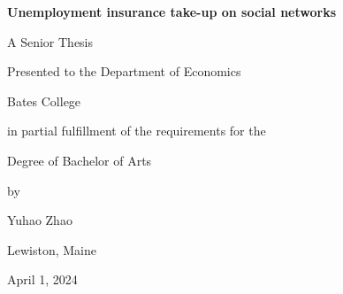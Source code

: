 

\vspace*{4cm} 

\centerline{\LARGE \textbf{Unemployment insurance take-up on social networks}}
\bigskip\bigskip
\centerline{\Large  A Senior Thesis}
\medskip
\centerline{\Large Presented to the Department of Economics}
\medskip
\centerline{\Large Bates College}
\medskip
\centerline{\Large in partial fulfillment of the requirements for the}
\medskip
\centerline{\Large Degree of Bachelor of Arts}
\medskip
\centerline{\Large by}
\medskip
\centerline{\Large Yuhao Zhao}
\medskip
\centerline{\Large Lewiston, Maine}
\medskip
\centerline{\Large April 1, 2024}


\centerline{}
\newpage

